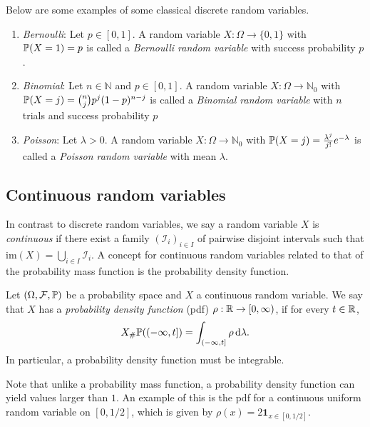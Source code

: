 Below are some examples of some classical discrete random variables.

\begin{example}\hfill
\begin{enumerate}[label=(\alph*)]
\item \textit{Bernoulli}: Let $p \in [0,1]$. A random variable $X : \Omega \to \{0,1\}$ with $\mathbb P(X = 1) = p$ is called a \emph{Bernoulli random variable} with success probability $p$.
\item \textit{Binomial}: Let $n \in \mathbb{N}$ and $p \in [0,1]$. A random variable $X : \Omega \to \mathbb{N}_0$ with $\mathbb P(X = j) = \binom{n}{j} p^j (1-p)^{n-j}$ is called a \emph{Binomial random variable} with $n$ trials and success probability $p$
\item \textit{Poisson}: Let $\lambda > 0$. A random variable $X : \Omega \to \mathbb{N}_0$ with $\mathbb P(X = j) = \frac{\lambda^j}{j!} e^{-\lambda}$ is called a \emph{Poisson random variable} with mean $\lambda$.
\end{enumerate}
\end{example}

\subsection{Continuous random variables}

In contrast to discrete random variables, we say a random variable $X$ is \emph{continuous} if there exist a family  $(\mathcal{I}_i)_{i \in I}$ of pairwise disjoint intervals such that $\mathrm{im}(X) = \bigcup_{i \in I} \mathcal{I}_i$.
A concept for continuous random variables related to that of the probability mass function is the probability density function. 

\begin{definition}\label{def:pdf}
Let $(\Omega, \mathcal F, \mathbb{P})$ be a probability space and $X$ a continuous random variable. We say that $X$ has a \emph{probability density function} (pdf) $\rho : \mathbb R \to [0,\infty)$, if for every $t \in \mathbb R$,
\[
	X_\# \mathbb P((-\infty , t]) = \int_{(-\infty,t]} \rho \, \mathrm{d} \lambda.
\]
In particular, a probability density function must be integrable.
\end{definition}

Note that unlike a probability mass function, a probability density function can yield values larger than $1$. An example of this is the pdf for a continuous uniform random variable on $[0,1/2]$, which is given by $\rho(x) = 2 \mathbf{1}_{x \in [0,1/2]}$.

